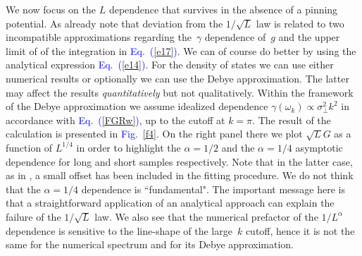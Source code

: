\documentclass[onecolumn,fleqn,notitlepage,secnumarabic]{revtex4}
\newcommand{\Eq}[1]{\textcolor{blue}{Eq.\!\!~(\ref{#1})}}
\newcommand{\Fig}[1]{\textcolor{blue}{Fig.}\!\!~\ref{#1}}
\begin{document}
%
We now focus on the $L$ dependence that survives in the absence of a pinning potential.
As already note that deviation from the $1/\sqrt{L}$ law is related to two incompatible 
approximations regarding the~$\gamma$ dependence of~$g$ 
and the upper limit of of the integration in \Eq{e17}.    
We can of course do better by using the analytical expression \Eq{e14}.
For the density of states we can use either numerical results 
or optionally we can use the Debye approximation. The latter 
may affect the results {\em quantitatively} but not qualitatively.
Within the framework of the Debye approximation we assume 
idealized dependence $\gamma(\omega_k) \propto \sigma_{\perp}^2 k^2$ 
in accordance with \Eq{FGRw}, up to the cutoff at $k=\pi$.
%
The result of the calculation is presented in \Fig{f4}.  
On the right panel there we plot $\sqrt{L}G$ as a function of $L^{1/4}$ 
in order to highlight the ${\alpha=1/2}$ and the ${\alpha=1/4}$ 
asymptotic dependence for long and short samples respectively. 
Note that in the latter case, as in \cite{BZFK13},  
a small offset has been included in the fitting procedure.
We do not think that the ${\alpha=1/4}$ dependence is ``fundamental". 
The important message here is that a straightforward application 
of an analytical approach can explain the failure of the $1/\sqrt{L}$ law. 
We also see that the numerical prefactor of the $1/L^{\alpha}$ dependence 
is sensitive to the line-shape of the large~$k$ cutoff, 
hence it is not the same for the numerical spectrum and for its Debye approximation. 
\\


\end{document}
